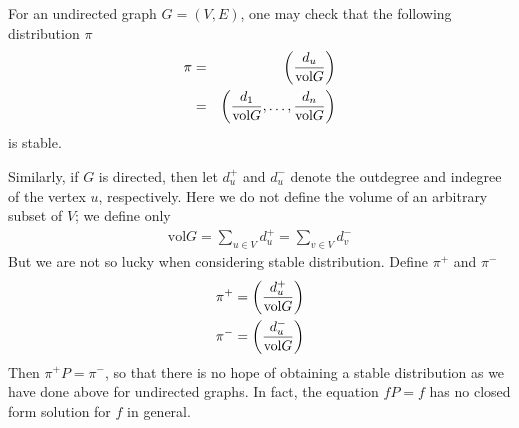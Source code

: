 For an undirected graph $G=(V,E)$, one may check that the following distribution
$\pi$
\begin{eqnarray*}
\pi&=&\left(d_u\over\text{vol}G\right)\\
&=&\left({d_1\over \text{vol}G}, \dots, {d_n\over\text{vol}G}\right)
\end{eqnarray*}
is stable.

Similarly, if $G$ is directed, then let $d^+_u$ and $d^-_u$ denote the outdegree and
indegree of the vertex $u$, respectively. Here we do not define the volume of an
arbitrary subset of $V$; we define only
\begin{eqnarray*}
\text{vol}G=\sum_{u\in V}d^+_u=\sum_{v\in V}d^-_v
\end{eqnarray*}
But we are not so lucky when considering stable distribution. Define $\pi^+$ and
$\pi^-$
\begin{eqnarray*}
\pi^+=\left({d^+_u\over\text{vol}G}\right)\\
\pi^-=\left({d^-_u\over\text{vol}G}\right)
\end{eqnarray*}
Then $\pi^+P=\pi^-$, so that there is no hope of obtaining a stable distribution as
we have done above for undirected graphs. In fact, the equation $fP=f$ has no closed
form solution for $f$ in general.
